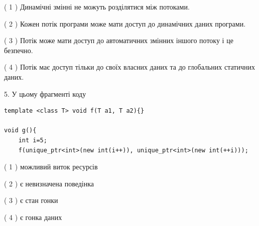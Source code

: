 \documentclass[12pt, ukrainian]{article}
\begin{document}
\begin {large}
{( 1 ) Динамічні змінні не можуть розділятися між потоками.%

( 2 ) Кожен потік програми може мати доступ до динамічних даних програми.%

( 3 ) Потік може мати доступ до автоматичних змінних іншого потоку і це безпечно.%

( 4 ) Потік має доступ тільки до своїх власних даних та до глобальних статичних даних.%


5. У цьому фрагменті коду
\begin{verbatim}
template <class T> void f(T a1, T a2){}

void g(){
    int i=5;
    f(unique_ptr<int>(new int(i++)), unique_ptr<int>(new int(++i)));
\end{verbatim}

( 1 ) можливий виток ресурсів%

( 2 ) є невизначена поведінка%

( 3 ) є стан гонки%

( 4 ) є гонка даних%
}
\end {large}
\end{document}
